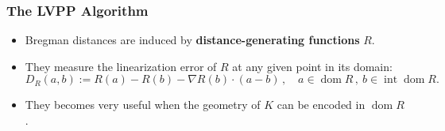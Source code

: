 \documentclass[aspectratio=169,xcolor=dvipsnames,11pt]{beamer}
\begin{document}
\begin{frame}


\end{frame}

\begin{frame}\frametitle{The LVPP Algorithm}
\begin{itemize}
\item Bregman distances are induced by \textbf{distance-generating functions} $R$.
\item They measure the linearization error of $R$ at any given point in its domain:
\begin{equation*}
D_R(a, b) := R(a) - R(b) - \nabla R(b) \cdot (a-b)\,, \quad a \in \text{$\mathop{\text{dom}} R$}\,,~b \in \text{$\mathop{\text{int}} \mathop{\text{dom}} R$}.
\end{equation*}
\item They becomes very \alert{useful} when the \alert{geometry} of $K$ can be \alert{encoded in $\mathop{\text{dom}} R$}.
\end{itemize}
\end{frame}
\end{document}
